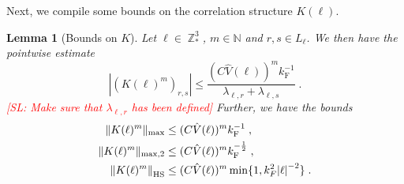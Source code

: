 \documentclass[sn-mathphys, Numbered ,a4paper]{sn-jnl}%
\DeclareMathOperator{\Z}{\mathbb{Z}}
\newcommand{\F}{\mathrm{F}}
\theoremstyle{plain}
\newtheorem{lemma}[theorem]{Lemma}
\theoremstyle{definition}
\theoremstyle{remark}
\theoremstyle{plain}
\theoremstyle{definition}
\theoremstyle{remark}
\begin{document}
Next, we compile some bounds on the correlation structure $ K(\ell) $.
\begin{lemma}[Bounds on $ K $] \label{lem:K_bounds}
	Let $ \ell \in \Z^3_* $, $ m \in \mathbb{N} $ and $ r,s \in L_\ell $. We then have the pointwise estimate
	\begin{equation} \label{eq:K_element_bounds}
		|(K(\ell)^m)_{r,s}|
		\le \frac{(C \hat{V}(\ell))^m k_{\F}^{-1}}{\lambda_{\ell,r} + \lambda_{\ell,s}} \;.
	\end{equation}
\textcolor{red}{[SL: Make sure that $ \lambda_{\ell,r} $ has been defined]} Further, we have the bounds
\begin{equation} \label{eq:K_max_bounds}
\begin{aligned}
	\Vert K(\ell)^m \Vert_{\mathrm{max}}
	&\le (C \hat{V}(\ell))^m k_{\F}^{-1} \;, \\
	\Vert K(\ell)^m \Vert_{\mathrm{max},2}
	&\le (C \hat{V}(\ell))^m k_{\F}^{-\frac 12} \;, \\
	\norm{K(\ell)^m}_{\mathrm{HS}}
	&\le (C \hat{V}(\ell))^m \min\{1,k^2_F\abs{\ell}^{-2}\} \;.
\end{aligned}   
\end{equation}
\end{lemma}
\end{document}
